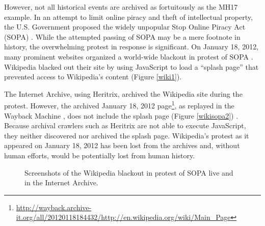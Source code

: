 \documentclass{sig-alternate}
\begin{document}
However, not all historical events are archived as fortuitously as the MH17 example. In an attempt to limit online piracy and theft of intellectual property, the U.S. Government proposed the widely unpopular Stop Online Piracy Act (SOPA) \cite{sopawiki}. While the attempted passing of SOPA may be a mere footnote in history, the overwhelming protest in response is significant. On January 18, 2012, many prominent websites organized a world-wide blackout in protest of SOPA \cite{sopapost, sopaabc}. Wikipedia blacked out their site by using JavaScript to load a ``splash page'' that prevented access to Wikipedia's content (Figure \ref{wiki1}).

The Internet Archive, using Heritrix, archived the Wikipedia site during the protest. However, the archived January 18, 2012 page\footnote{\url{http://wayback.archive-it.org/all/20120118184432/http://en.wikipedia.org/wiki/Main_Page}}, as replayed in the Wayback Machine \cite{waybackarchives2}, does not include the splash page (Figure \ref{wikisopa2}) \cite{brunelleSopa}. Because archival crawlers such as Heritrix are not able to execute JavaScript, they neither discovered nor archived the splash page. Wikipedia's protest as it appeared on January 18, 2012 has been lost from the archives and, without human efforts, would be potentially lost from human history. 


\begin{figure}
  \begin{center}
    \qquad
  \end{center}
  \caption{Screenshots of the Wikipedia blackout in protest of SOPA live and in the Internet Archive.}
  \label{liveWiki}
\end{figure}
\end{document}
